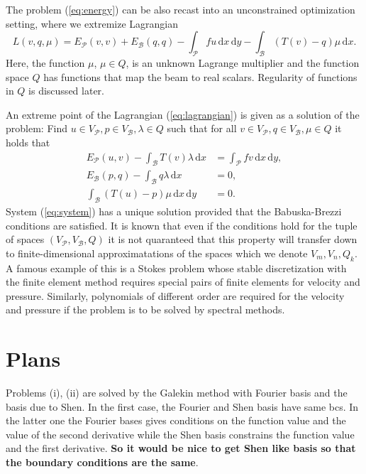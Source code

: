 \documentclass[a4paper,10pt]{article}
\newcommand{\meas}[1]{\ensuremath{\,\mathrm{d}#1}}
\newcommand{\Vp}{\ensuremath{V_{\mathcal{P}}}}
\newcommand{\Vb}{\ensuremath{V_{\mathcal{B}}}}
\newcommand{\Ep}{\ensuremath{E_{\mathcal{P}}}}
\newcommand{\Eb}{\ensuremath{E_{\mathcal{B}}}}
\begin{document}
  The problem (\ref{eq:energy}) can be also recast into an unconstrained
  optimization setting, where we extremize Lagrangian
  \begin{equation}
    \label{eq:lagrangian}
    L(v, q, \mu) = \Ep(v, v) + \Eb(q, q) - \int_{\mathcal{P}}f u \meas{x}\meas{y} -
    \int_{\mathcal{B}}(T(v) - q)\mu \meas{x}.
  \end{equation}
  Here, the function $\mu$, $\mu\in Q$, is an unknown Lagrange multiplier
  and the function space $Q$ has functions that map the beam to real scalars.
  Regularity of functions in $Q$ is discussed later.

  An extreme point of the Lagrangian (\ref{eq:lagrangian}) is given as a
  solution of the problem: Find $u\in\Vp, p\in\Vb, \lambda\in Q$ such that
  for all $v\in\Vp, q\in\Vb, \mu\in Q$ it holds that
 \begin{equation}
    \label{eq:system}
    \begin{aligned}
      \Ep(u, v) - \int_{\mathcal{B}}T(v)\lambda\meas{x} &=
      \int_{\mathcal{P}}fv\meas{x}\meas{y}, \\
      \Eb(p, q) - \int_{\mathcal{B}}q\lambda\meas{x} &= 0, \\
      \int_{\mathcal{B}}(T(u)-p)\mu\meas{x}\meas{y} &= 0.
    \end{aligned}
  \end{equation}
  System (\ref{eq:system}) has a unique solution provided that the
  Babuska-Brezzi conditions are satisfied. It is known that even if the
  conditions hold for the tuple of spaces $(\Vp, \Vb, Q)$ it is not quaranteed
  that this property will transfer down to finite-dimensional approximatations
  of the spaces which we denote $V_m, V_n, Q_k$. A famous example of this
  is a Stokes problem whose stable discretization with the finite element method
  requires special pairs of finite elements for velocity and pressure.
  Similarly, polynomials of different order are required for the velocity and
  pressure if the problem is to be solved by spectral methods.

  \section{Plans}

  Problems (i), (ii) are solved by the Galekin method with Fourier basis and
  the basis due to Shen. In the first case, the Fourier and Shen basis have
  same bcs. In the latter one the Fourier bases gives conditions on the function
  value and the value of the second derivative while the Shen basis constrains
  the function value and the first derivative. \textbf{So it would be nice to 
  get Shen like basis so that the boundary conditions are the same}.
\end{document}
